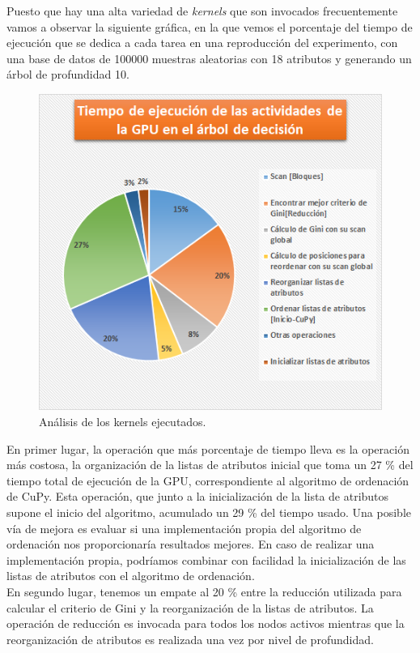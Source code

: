 Puesto que hay una alta variedad de \textit{kernels} que son invocados frecuentemente vamos a observar la siguiente gráfica, en la que vemos el porcentaje del tiempo de ejecución que se dedica a cada tarea en una reproducción del experimento, con una base de datos de 100000 muestras aleatorias con 18 atributos y generando un árbol de profundidad 10.

\begin{figure}[ht]
\centering
\includegraphics[scale=0.8]{imagenes/profiletreequesito.png}
\caption{Análisis de los kernels ejecutados.}
\label{img:quesito}
\end{figure}

En primer lugar, la operación que más porcentaje de tiempo lleva es la operación más costosa, la organización de la listas de atributos inicial que toma un 27 \% del tiempo total de ejecución de la GPU, correspondiente al algoritmo de ordenación de CuPy. Esta operación, que junto a la inicialización de la lista de atributos supone el inicio del algoritmo, acumulado un 29 \% del tiempo usado. Una posible vía de mejora es evaluar si una implementación propia del algoritmo de ordenación nos proporcionaría resultados mejores. En caso de realizar una implementación propia, podríamos combinar con facilidad la inicialización de las listas de atributos con el algoritmo de ordenación. \\

En segundo lugar, tenemos un empate al 20 \% entre la reducción utilizada para calcular el criterio de Gini y la reorganización de la listas de atributos. La operación de reducción es invocada para todos los nodos activos mientras que la reorganización de atributos es realizada una vez por nivel de profundidad. \\

